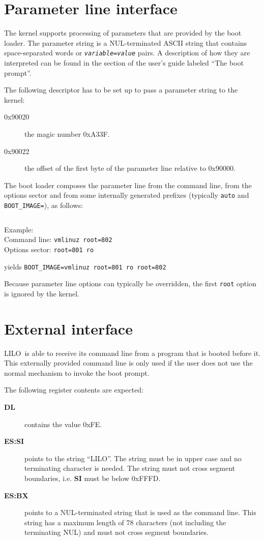 \documentclass[fullpage]{article}
\def\LILO{LILO}
\begin{document}
\section{Parameter line interface}

The kernel supports processing of parameters that are
provided by the boot loader. The parameter string is a NUL-terminated
ASCII string that contains space-separated words or
{\tt {\it variable\/}={\it value\/}} pairs. A description of how they are
interpreted can be found in the section of the user's guide labeled
``The boot prompt''.

The following descriptor has to be set up to pass a parameter string to
the kernel:

\begin{description}
  \item[0x90020] the magic number 0xA33F.
  \item[0x90022] the offset of the first byte of the parameter line relative
    to 0x90000.
\end{description}

The boot loader composes the parameter line from the command line, from
the options sector and from some internally generated prefixes (typically
\verb"auto" and \verb"BOOT_IMAGE="), as follows:

$$
  
$$

Example: \\
Command line: \verb"vmlinuz root=802"\\
Options sector: \verb"root=801 ro"

yields \verb"BOOT_IMAGE=vmlinuz root=801 ro root=802"

Because parameter line options can typically be overridden, the first
\verb"root" option is ignored by the kernel.


\section{External interface}

\LILO\ is able to receive its command line from a program that is booted
before it. This externally provided command line is only used if the
user does not use the normal mechanism to invoke the boot prompt.

The following register contents are expected:

\begin{description}
  \item[\bf DL] contains the value 0xFE.
  \item[\bf ES:SI] points to the string ``LILO''. The string must be in
    upper case and no terminating character is needed. The string must not
    cross segment boundaries, i.e. {\bf SI} must be below 0xFFFD.
  \item[\bf ES:BX] points to a NUL-terminated string that is used as the
    command line. This string has a maximum length of 78 characters (not
    including the terminating NUL) and must not cross segment boundaries.
\end{description}
\end{document}
